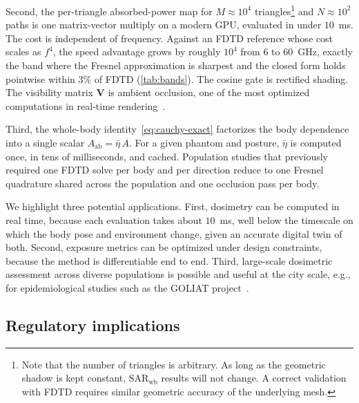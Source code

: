 \documentclass[journal,twocolumn,10pt]{IEEEtran}
\newcommand{\Aab}{A_{\mathrm{ab}}}
\begin{document}
Second, the per-triangle absorbed-power map for $M \approx 10^4$ triangles\footnote{Note
that the number of triangles is arbitrary. As long as the geometric shadow is
kept constant, $\mathrm{SAR}_{\mathrm{wb}}$ results will not change. A correct
validation with FDTD requires similar geometric accuracy of the underlying
mesh.}
and $N \approx 10^2$ paths is one matrix-vector multiply on
a modern GPU, evaluated in under $10$~ms. The cost is independent of
frequency. Against an FDTD reference whose cost scales as $f^4$, the
speed advantage grows by roughly $10^4$ from $6$ to $60$~GHz, exactly
the band where the Fresnel approximation is sharpest and the closed
form holds pointwise within $3\%$ of FDTD (\cref{tab:bands}). The
cosine gate is rectified shading. The visibility matrix $\mathbf{V}$
is ambient occlusion, one of the most optimized computations in
real-time rendering~\cite{AkenineMoller2018}.

Third, the whole-body identity~\eqref{eq:cauchy-exact} factorizes the
body dependence into a single scalar $\Aab = \bar\eta\,A$. For a
given phantom and posture, $\bar\eta$ is computed once, in tens of
milliseconds, and cached. Population studies that previously
required one FDTD solve per body and per direction reduce to one
Fresnel quadrature shared across the population and one occlusion
pass per body.

We highlight three potential applications. First, dosimetry can be
computed in real time, because each evaluation takes about $10$~ms,
well below the timescale on which the body pose and environment
change, given an accurate digital twin of both. Second, exposure
metrics can be optimized under design constraints, because the method
is differentiable end to end. Third, large-scale dosimetric assessment
across diverse populations is possible and useful at the city scale,
e.g., for epidemiological studies such as the GOLIAT
project~\cite{Goliat}.

\subsection{Regulatory implications}\label{subsec:disc-regulatory}
\end{document}
